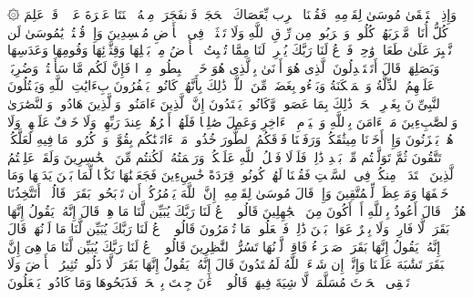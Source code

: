 \stopbuffer
\startbuffer[\q:2:60]
۞ وَإِذِ ٱسۡتَسۡقَىٰ مُوسَىٰ لِقَوۡمِهِۦ فَقُلۡنَا ٱضۡرِب بِّعَصَاكَ ٱلۡحَجَرَۖ فَٱنفَجَرَتۡ مِنۡهُ ٱثۡنَتَا عَشۡرَةَ عَیۡنࣰاۖ قَدۡ عَلِمَ كُلُّ أُنَاسࣲ مَّشۡرَبَهُمۡۖ كُلُوا۟ وَٱشۡرَبُوا۟ مِن رِّزۡقِ ٱللَّهِ وَلَا تَعۡثَوۡا۟ فِی ٱلۡأَرۡضِ مُفۡسِدِینَ%
\stopbuffer
\startbuffer[\q:2:61]
وَإِذۡ قُلۡتُمۡ یَٰمُوسَىٰ لَن نَّصۡبِرَ عَلَىٰ طَعَامࣲ وَٰحِدࣲ فَٱدۡعُ لَنَا رَبَّكَ یُخۡرِجۡ لَنَا مِمَّا تُنۢبِتُ ٱلۡأَرۡضُ مِنۢ بَقۡلِهَا وَقِثَّاۤئِهَا وَفُومِهَا وَعَدَسِهَا وَبَصَلِهَاۖ قَالَ أَتَسۡتَبۡدِلُونَ ٱلَّذِی هُوَ أَدۡنَىٰ بِٱلَّذِی هُوَ خَیۡرٌۚ ٱهۡبِطُوا۟ مِصۡرࣰا فَإِنَّ لَكُم مَّا سَأَلۡتُمۡۗ وَضُرِبَتۡ عَلَیۡهِمُ ٱلذِّلَّةُ وَٱلۡمَسۡكَنَةُ وَبَاۤءُو بِغَضَبࣲ مِّنَ ٱللَّهِۗ ذَٰلِكَ بِأَنَّهُمۡ كَانُوا۟ یَكۡفُرُونَ بِءَایَٰتِ ٱللَّهِ وَیَقۡتُلُونَ ٱلنَّبِیِّۦنَ بِغَیۡرِ ٱلۡحَقِّۗ ذَٰلِكَ بِمَا عَصَوا۟ وَّكَانُوا۟ یَعۡتَدُونَ%
\stopbuffer
\startbuffer[\q:2:62]
إِنَّ ٱلَّذِینَ ءَامَنُوا۟ وَٱلَّذِینَ هَادُوا۟ وَٱلنَّصَٰرَىٰ وَٱلصَّٰبِءِینَ مَنۡ ءَامَنَ بِٱللَّهِ وَٱلۡیَوۡمِ ٱلۡءَاخِرِ وَعَمِلَ صَٰلِحࣰا فَلَهُمۡ أَجۡرُهُمۡ عِندَ رَبِّهِمۡ وَلَا خَوۡفٌ عَلَیۡهِمۡ وَلَا هُمۡ یَحۡزَنُونَ%
\stopbuffer
\startbuffer[\q:2:63]
وَإِذۡ أَخَذۡنَا مِیثَٰقَكُمۡ وَرَفَعۡنَا فَوۡقَكُمُ ٱلطُّورَ خُذُوا۟ مَاۤ ءَاتَیۡنَٰكُم بِقُوَّةࣲ وَٱذۡكُرُوا۟ مَا فِیهِ لَعَلَّكُمۡ تَتَّقُونَ%
\stopbuffer
\startbuffer[\q:2:64]
ثُمَّ تَوَلَّیۡتُم مِّنۢ بَعۡدِ ذَٰلِكَۖ فَلَوۡلَا فَضۡلُ ٱللَّهِ عَلَیۡكُمۡ وَرَحۡمَتُهُۥ لَكُنتُم مِّنَ ٱلۡخَٰسِرِینَ%
\stopbuffer
\startbuffer[\q:2:65]
وَلَقَدۡ عَلِمۡتُمُ ٱلَّذِینَ ٱعۡتَدَوۡا۟ مِنكُمۡ فِی ٱلسَّبۡتِ فَقُلۡنَا لَهُمۡ كُونُوا۟ قِرَدَةً خَٰسِءِینَ%
\stopbuffer
\startbuffer[\q:2:66]
فَجَعَلۡنَٰهَا نَكَٰلࣰا لِّمَا بَیۡنَ یَدَیۡهَا وَمَا خَلۡفَهَا وَمَوۡعِظَةࣰ لِّلۡمُتَّقِینَ%
\stopbuffer
\startbuffer[\q:2:67]
وَإِذۡ قَالَ مُوسَىٰ لِقَوۡمِهِۦۤ إِنَّ ٱللَّهَ یَأۡمُرُكُمۡ أَن تَذۡبَحُوا۟ بَقَرَةࣰۖ قَالُوۤا۟ أَتَتَّخِذُنَا هُزُوࣰاۖ قَالَ أَعُوذُ بِٱللَّهِ أَنۡ أَكُونَ مِنَ ٱلۡجَٰهِلِینَ%
\stopbuffer
\startbuffer[\q:2:68]
قَالُوا۟ ٱدۡعُ لَنَا رَبَّكَ یُبَیِّن لَّنَا مَا هِیَۚ قَالَ إِنَّهُۥ یَقُولُ إِنَّهَا بَقَرَةࣱ لَّا فَارِضࣱ وَلَا بِكۡرٌ عَوَانُۢ بَیۡنَ ذَٰلِكَۖ فَٱفۡعَلُوا۟ مَا تُؤۡمَرُونَ%
\stopbuffer
\startbuffer[\q:2:69]
قَالُوا۟ ٱدۡعُ لَنَا رَبَّكَ یُبَیِّن لَّنَا مَا لَوۡنُهَاۚ قَالَ إِنَّهُۥ یَقُولُ إِنَّهَا بَقَرَةࣱ صَفۡرَاۤءُ فَاقِعࣱ لَّوۡنُهَا تَسُرُّ ٱلنَّٰظِرِینَ%
\stopbuffer
\startbuffer[\q:2:70]
قَالُوا۟ ٱدۡعُ لَنَا رَبَّكَ یُبَیِّن لَّنَا مَا هِیَ إِنَّ ٱلۡبَقَرَ تَشَٰبَهَ عَلَیۡنَا وَإِنَّاۤ إِن شَاۤءَ ٱللَّهُ لَمُهۡتَدُونَ%
\stopbuffer
\startbuffer[\q:2:71]
قَالَ إِنَّهُۥ یَقُولُ إِنَّهَا بَقَرَةࣱ لَّا ذَلُولࣱ تُثِیرُ ٱلۡأَرۡضَ وَلَا تَسۡقِی ٱلۡحَرۡثَ مُسَلَّمَةࣱ لَّا شِیَةَ فِیهَاۚ قَالُوا۟ ٱلۡءَٰنَ جِئۡتَ بِٱلۡحَقِّۚ فَذَبَحُوهَا وَمَا كَادُوا۟ یَفۡعَلُونَ%
